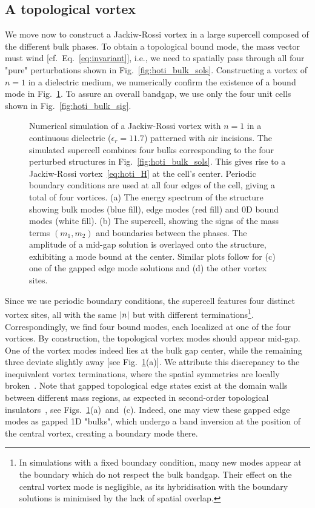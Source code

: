 \subsection{A topological vortex}

We move now to construct a Jackiw-Rossi vortex in a large supercell composed of the different bulk phases. To obtain a topological bound mode, the mass vector must wind [cf.~Eq.~\eqref{eq:invariant}], i.e., we need to spatially pass through all four "pure" perturbations shown in Fig.~\ref{fig:hoti_bulk_sols}. 
Constructing a vortex of $n=1$ in a dielectric medium, we numerically confirm the existence of a bound mode in Fig.~\ref{fig:hoti_fig4}. To assure an overall bandgap, we use only the four unit cells shown in Fig.~\ref{fig:hoti_bulk_sig}.
%
\begin{figure} [h!]
	\centering
	
	\caption{Numerical simulation of a Jackiw-Rossi vortex with $n = 1$ in a continuous dielectric ($\epsilon_r = 11.7$) patterned with air incisions. The simulated supercell combines four bulks corresponding to the four perturbed structures in Fig.~\ref{fig:hoti_bulk_sols}. This gives rise to a Jackiw-Rossi vortex~\eqref{eq:hoti_H} at the cell's center. Periodic boundary conditions are used at all four edges of the cell, giving a total of four vortices. (a) The energy spectrum of the structure showing bulk modes (blue fill), edge modes (red fill) and 0D bound modes (white fill). (b) The supercell, showing the signs of the mass terms $(m_1, m_2)$ and boundaries between the phases. The amplitude of a mid-gap solution is overlayed onto the structure, exhibiting a mode bound at the center. Similar plots follow for (c) one of the gapped edge mode solutions and (d) the other vortex sites.}
	\label{fig:hoti_fig4}
\end{figure}
%
Since we use periodic boundary conditions, the supercell features four distinct vortex sites, all with the same $\abs{n}$ but with different terminations\footnote{In simulations with a fixed boundary condition, many new modes appear at the boundary which do not respect the bulk bandgap. Their effect on the central vortex mode is negligible, as its hybridisation with the boundary solutions is minimised by the lack of spatial overlap.}. Correspondingly, we find four bound modes, each localized at one of the four vortices. By construction, the topological vortex modes should appear mid-gap. One of the vortex modes indeed lies at the bulk gap center, while the remaining three deviate slightly away [see Fig.~\ref{fig:hoti_fig4}(a)]. We attribute this discrepancy to the inequivalent vortex terminations, where the spatial symmetries are locally broken~\cite{Gao_2020}. Note that gapped topological edge states exist at the domain walls between different mass regions, as expected in second-order topological insulators~\cite{Benalcazar_2017a,Benalcazar_2017b,Petrides_2020}, see Figs.~\ref{fig:hoti_fig4}(a)~and~(c). Indeed, one may view these gapped edge modes as gapped 1D "bulks", which undergo a band inversion at the position of the central vortex, creating a boundary mode there.  

